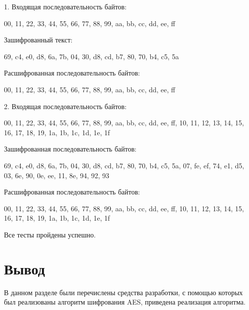 1. Входящая последовательность байтов:

00, 11, 22, 33, 44, 55, 66, 77, 88, 99, aa, bb, cc, dd, ee, ff

Зашифрованный текст:

69, c4, e0, d8, 6a, 7b, 04, 30, d8, cd, b7, 80, 70, b4, c5, 5a
	 
Расшифрованная последовательность байтов:

00, 11, 22, 33, 44, 55, 66, 77, 88, 99, aa, bb, cc, dd, ee, ff

2. Входящая последовательность байтов:

00, 11, 22, 33, 44, 55, 66, 77,
88, 99, aa, bb, cc, dd, ee, ff,
10, 11, 12, 13, 14, 15, 16, 17,
18, 19, 1a, 1b, 1c, 1d, 1e, 1f

Зашифрованная последовательность байтов:

69, c4, e0, d8, 6a, 7b, 04, 30, d8, cd, b7,
80, 70, b4, c5, 5a, 07, fe, ef, 74, e1, d5,
03, 6e, 90, 0e, ee, 11, 8e, 94, 92, 93

Расшифрованная последовательность байтов:

00, 11, 22, 33, 44, 55, 66, 77,
88, 99, aa, bb, cc, dd, ee, ff,
10, 11, 12, 13, 14, 15, 16, 17,
18, 19, 1a, 1b, 1c, 1d, 1e, 1f

Все тесты пройдены успешно.

\section*{Вывод}
В данном разделе были перечислены средства разработки, с помощью которых был реализованы алгоритм шифрования AES, приведена реализация алгоритма.


